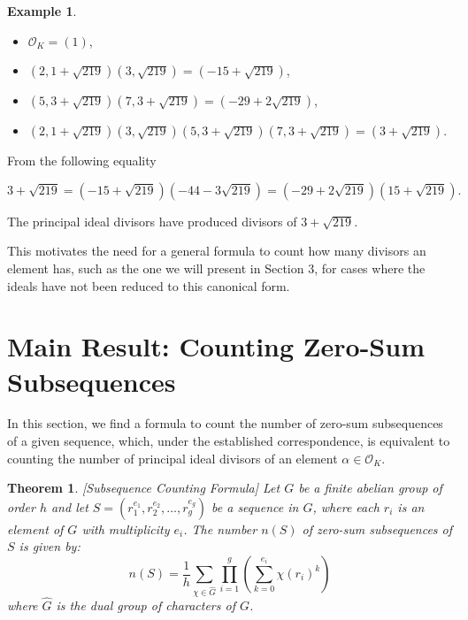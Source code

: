 \documentclass[11pt]{article}
\newtheorem{theorem}{Theorem}
\theoremstyle{definition}
\newtheorem{example}{Example}
\begin{document}
\begin{example}
\begin{itemize}

    \item $\mathcal{O}_K=(1)$,

    \item $(2,1+\sqrt{219})(3,\sqrt{219})=(-15+\sqrt{219})$,

    \item $(5,3+\sqrt{219})(7,3+\sqrt{219})=(-29+2\sqrt{219})$,

    \item $(2,1+\sqrt{219})(3,\sqrt{219})(5,3+\sqrt{219})(7,3+\sqrt{219})=(3+\sqrt{219})$.
    
\end{itemize}

From the following equality 

\[ 3+\sqrt{219}=(-15+\sqrt{219})(-44-3\sqrt{219})=(-29+2\sqrt{219})(15+\sqrt{219}). \]

\noindent The principal ideal divisors have produced divisors of $3+\sqrt{219}$. 

\end{example}
This motivates the need for a general formula to count how many divisors an element has, such as the one we will present in Section 3, for cases where the ideals have not been reduced to this canonical form.


\section{Main Result: Counting Zero-Sum Subsequences}

In this section, we find a formula to count the number of zero-sum subsequences of a given sequence, which, under the established correspondence, is equivalent to counting the number of principal ideal divisors of an element $\alpha \in \mathcal{O}_K$.

\begin{theorem}\label{teo2}[Subsequence Counting Formula]
Let $G$ be a finite abelian group of order $h$ and let $S = (r_1^{e_1}, r_2^{e_2}, \dots, r_g^{e_g})$ be a sequence in $G$, where each $r_i$ is an element of $G$ with multiplicity $e_i$. The number $n(S)$ of zero-sum subsequences of $S$ is given by:
\begin{equation}
    n(S) = \frac{1}{h} \sum_{\chi \in \hat{G}} \prod_{i=1}^{g} \left( \sum_{k=0}^{e_i} \chi(r_i)^k \right)
\end{equation}
where $\hat{G}$ is the dual group of characters of $G$.
\end{theorem}
\end{document}
